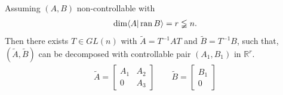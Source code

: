 \begin{lemma}
	Assuming $(A, B)$ non-controllable with
	\begin{align*}
		\dim \langle A|\operatorname{ran} B \rangle = r \lneqq n . 
	\end{align*}
	Then there exists $T \in GL(n)$ with $\tilde{A} = T^{-1} A T$ and $\tilde{B} = T^{-1} B$, such that, $(\tilde{A}, \tilde{B})$ can be decomposed with controllable pair $(A_1, B_1)$ in $\mathbb{R}^r$. 
	\begin{align*}
		\tilde{A}= 
		\begin{bmatrix}
			A_1 & A_2 \\
			0 & A_3
		\end{bmatrix}
		\qquad \tilde{B} = 
		\begin{bmatrix}
			B_1\\
			0
		\end{bmatrix}
	\end{align*}
\end{lemma}

